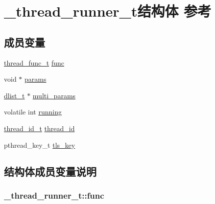 \hypertarget{a00036}{}\section{\+\_\+thread\+\_\+runner\+\_\+t结构体 参考}
\label{a00036}
\subsection*{成员变量}
\begin{DoxyCompactItemize}
\item 
\hyperlink{a00051_a46bcd8005e5d86fdbc6be5af0a77156c_a46bcd8005e5d86fdbc6be5af0a77156c}{thread\+\_\+func\+\_\+t} \hyperlink{a00036_a5e254750aa5522725788d808314b6620_a5e254750aa5522725788d808314b6620}{func}
\item 
void $\ast$ \hyperlink{a00036_aab08f4e0fa5f6ffe16fcd3c055666c9c_aab08f4e0fa5f6ffe16fcd3c055666c9c}{params}
\item 
\hyperlink{a00051_ad6644d67df4b4e3596c1eb12977d1d16_ad6644d67df4b4e3596c1eb12977d1d16}{dlist\+\_\+t} $\ast$ \hyperlink{a00036_ac7256131136cb877833040554a384e6d_ac7256131136cb877833040554a384e6d}{multi\+\_\+params}
\item 
volatile int \hyperlink{a00036_a158d37a73657b2df73e3a2dd383808f8_a158d37a73657b2df73e3a2dd383808f8}{running}
\item 
\hyperlink{a00051_ad0ada5642d10ce71bdd90816182f9b79_ad0ada5642d10ce71bdd90816182f9b79}{thread\+\_\+id\+\_\+t} \hyperlink{a00036_ab632944b59861e33a9473347b0afdc00_ab632944b59861e33a9473347b0afdc00}{thread\+\_\+id}
\item 
pthread\+\_\+key\+\_\+t \hyperlink{a00036_ad7461a4eef9b83e07f0acd4f26923744_ad7461a4eef9b83e07f0acd4f26923744}{tls\+\_\+key}
\end{DoxyCompactItemize}


\subsection{结构体成员变量说明}
\hypertarget{a00036_a5e254750aa5522725788d808314b6620_a5e254750aa5522725788d808314b6620}{}
\subsubsection[{func}]{ \+\_\+thread\+\_\+runner\+\_\+t\+::func}\label{a00036_a5e254750aa5522725788d808314b6620_a5e254750aa5522725788d808314b6620}
\hypertarget{a00036_ac7256131136cb877833040554a384e6d_ac7256131136cb877833040554a384e6d}{}
